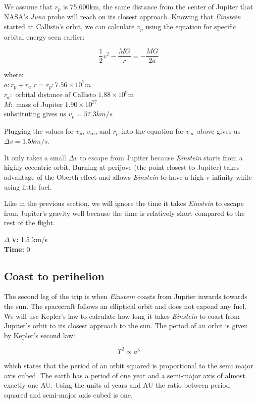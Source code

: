 \documentclass[12pt]{article} %
\begin{document}
We assume that $r_p$ is 75,600km, the same distance from the center of Jupiter that NASA's \textit{Juno} probe will reach on its closest approach. Knowing that \textit{Einstein} started at Callisto's orbit, we can calculate $v_p$ using the equation for specific orbital energy seen earlier:

$$\frac{1}{2}v^2-\frac{MG}{r} = -\frac{MG}{2a}$$

where:\\
$a: r_p + r_a$
$r = r_p: 7.56\times 10^7m$\\
$r_a:$ orbital distance of Callisto $1.88 \times 10^9$m\\
$M:$ mass of Jupiter $1.90\times10^27$\\


substituting gives us \textbf{$v_p = 57.3 km/s$}

Plugging the values for $v_p$, $v_{\infty}$, and $r_p$ into the equation for $v_{\infty}$ above gives us \textbf{$\Delta v = 1.5km/s$}.

It only takes a small $\Delta v$ to escape from Jupiter because \textit{Einstein} starts from a highly eccentric orbit. Burning at perijove (the point closest to Jupiter) takes advantage of the Oberth effect and allows \textit{Einstein} to have a high v-infinity while using little fuel.

Like in the previous section, we will ignore the time it takes \textit{Einstein} to escape from Jupiter's gravity well because the time is relatively short compared to the rest of the flight. 


$\Delta$ \textbf{v:} 1.5 km/s\\
\textbf{Time:} 0

\subsection{Coast to perihelion}
The second leg of the trip is when \textit{Einstein} coasts from Jupiter inwards towards the sun. The spacecraft follows an elliptical orbit and does not expend any fuel. We will use Kepler's law to calculate how long it takes \textit{Einstein} to coast from Jupiter's orbit to its closest approach to the sun. The period of an orbit is given by Kepler's second law:

$$T^2 \propto a^3$$

which states that the period of an orbit squared is proportional to the semi major axis cubed. The earth has a period of one year and a semi-major axis of almost exactly one AU. Using the units of years and AU the ratio between period squared and semi-major axis cubed is one.
\end{document}
